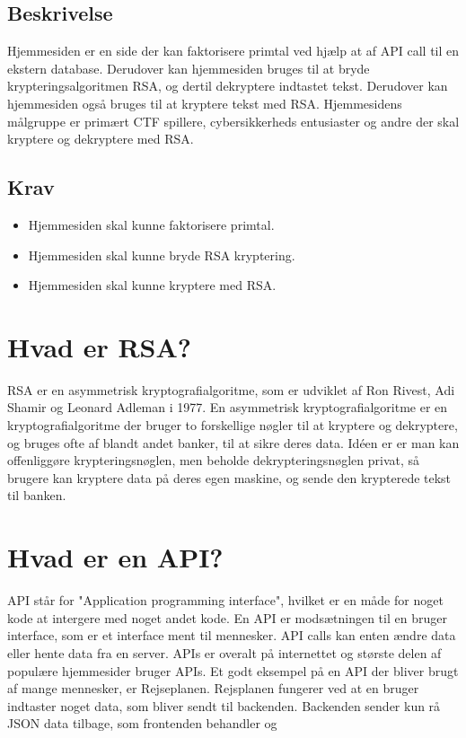 \documentclass{article}
\begin{document}
    \subsection{Beskrivelse}\label{subsec:beskrivelse}
    Hjemmesiden er en side der kan faktorisere primtal ved hjælp at af API call til en ekstern database.
    Derudover kan hjemmesiden bruges til at bryde krypteringsalgoritmen RSA, og dertil dekryptere indtastet tekst.
    Derudover kan hjemmesiden også bruges til at kryptere tekst med RSA. Hjemmesidens målgruppe er primært CTF
    spillere, cybersikkerheds entusiaster og andre der skal kryptere og dekryptere med RSA.

    \subsection{Krav}\label{subsec:krav}
    \begin{itemize}
        \item Hjemmesiden skal kunne faktorisere primtal.
        \item Hjemmesiden skal kunne bryde RSA kryptering.
        \item Hjemmesiden skal kunne kryptere med RSA.
    \end{itemize}



    \section{Hvad er RSA?}\label{sec:hvad-er-rsa}
    RSA er en asymmetrisk kryptografialgoritme, som er udviklet af Ron Rivest, Adi Shamir og Leonard Adleman i 1977.
    En asymmetrisk kryptografialgoritme er en kryptografialgoritme der bruger to forskellige nøgler til at kryptere og dekryptere,
    og bruges ofte af blandt andet banker, til at sikre deres data.
    Idéen er er man kan offenliggøre krypteringsnøglen, men beholde dekrypteringsnøglen privat, så brugere kan kryptere data på deres egen maskine,
    og sende den krypterede tekst til banken.
    
    \section{Hvad er en API?}\label{sec:hvad-er-en-api}
    API står for "Application programming interface", hvilket er en måde for noget kode at intergere med noget andet kode. En API er modsætningen til en bruger interface, som er et interface ment til mennesker. API calls kan enten ændre data eller hente data fra en server. APIs er overalt på internettet og største delen af populære hjemmesider bruger APIs. Et godt eksempel på en API der bliver brugt af mange mennesker, er Rejseplanen. Rejsplanen fungerer ved at en bruger indtaster noget data, som bliver sendt til backenden. Backenden sender kun rå JSON data tilbage, som frontenden behandler og 
\end{document}
